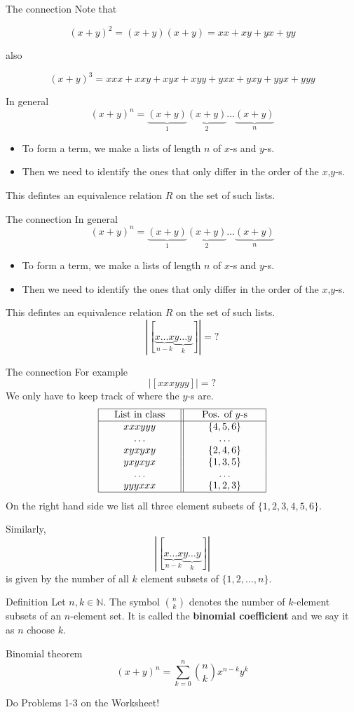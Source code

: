 \documentclass{beamer}
\def\bl[#1]#2{\begin{block}{#1}#2\end{block}}
\def\itemb{\begin{itemize}}
\def\iteme{\end{itemize}}
\begin{document}
\begin{frame}{The connection}
Note that
\bl[]{
\[
(x+y)^2=(x+y)(x+y)=xx+xy+yx+yy
\]}
also
\bl[]{\vspace{-0.3cm}
\[
(x+y)^3=xxx+xxy+xyx+xyy+yxx+yxy+yyx+yyy
\]}
In general
\[
(x+y)^n=\underbrace{(x+y)}_{1}\underbrace{(x+y)}_{2}\dots\underbrace{(x+y)}_{n}
\]
\itemb
\item To form a term, we make a lists of length $n$ of $x$-s and $y$-s. 
\item Then we need to identify the ones that only differ in the order of the $x$,$y$-s. 
\iteme
This defintes an equivalence relation $R$ on the set of such lists.
\end{frame}

\begin{frame}{The connection}
In general
\[
(x+y)^n=\underbrace{(x+y)}_{1}\underbrace{(x+y)}_{2}\dots\underbrace{(x+y)}_{n}
\]
\itemb
\item To form a term, we make a lists of length $n$ of $x$-s and $y$-s. 
\item Then we need to identify the ones that only differ in the order of the $x$,$y$-s. 
\iteme
This defintes an equivalence relation $R$ on the set of such lists.
\[
|[\underbrace{x\dots x}_{n-k}\underbrace{y\dots y}_{k}]|=?
\]
\end{frame}

\begin{frame}{The connection}
For example
\[
|[xxxyyy]|=?
\]
We only have to keep track of where the $y$-s are.
\[
\begin{tabular}{| >{\centering\arraybackslash}b{1in}|| >{\centering\arraybackslash}b{1in}|}
\hline
\textrm{List in class}& \textrm{Pos. of $y$-s}\\
\hline
$xxxyyy$ & $\{4,5,6\}$\\
$\hdots$&$\hdots$\\
$xyxyxy$& $\{2,4,6\}$\\
$yxyxyx$& $\{1,3,5\}$\\
$\hdots$& $\hdots$\\
$yyyxxx$& $\{1,2,3\}$\\
\hline
\end{tabular}
\]
On the right hand side we list all three element subsets of $\{1,2,3,4,5,6\}$.
\end{frame}

\begin{frame}
Similarly,
\[
|[\underbrace{x\dots x}_{n-k}\underbrace{y\dots y}_{k}]|
\]
is given by the number of all $k$ element subsets of $\{1,2,\dots,n\}$.
\bl[Definition]{
Let $n,k\in\mathbb{N}$. The symbol $\binom{n}{k}$ denotes the number of $k$-element subsets of an $n$-element set. It is called the \textbf{binomial coefficient} and we say it as $n$ choose $k$.
}
\bl[Binomial theorem]{
\[
(x+y)^n=\sum_{k=0}^{n}\binom{n}{k}x^{n-k}y^k
\]
}

Do Problems 1-3 on the Worksheet!
\end{frame}
\end{document}
